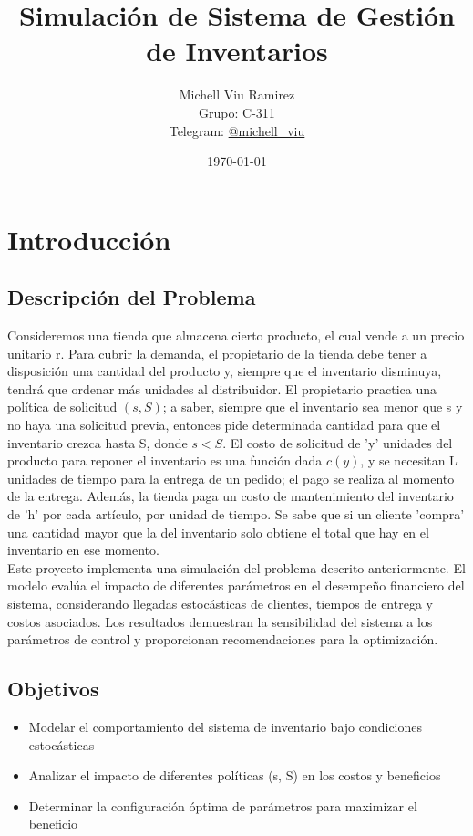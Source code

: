 \documentclass{article}
\title{Simulación de Sistema de Gestión de Inventarios}
\author{Michell Viu Ramirez \\ Grupo: C-311 \\ Telegram: \href{https://t.me/michell_viu}{@michell\_viu}}
\date{\today}
\begin{document}
\maketitle
\newpage

\section{Introducción}

\subsection{Descripción del Problema}
Consideremos una tienda que almacena cierto producto, el cual vende a un precio unitario r.
Para cubrir la demanda, el propietario de la tienda debe tener a disposición una cantidad del producto
y, siempre que el inventario disminuya, tendrá que ordenar más unidades al distribuidor.
El propietario practica una política de solicitud $(s,S)$; a saber, siempre que el inventario sea
menor que s y no haya una solicitud previa, entonces pide determinada cantidad para que
el inventario crezca hasta S, donde $s < S$. El costo de solicitud de 'y' unidades del producto para reponer el inventario 
es una función dada $c(y)$, y se necesitan L unidades de tiempo para la entrega de un pedido; el pago se realiza al momento de la entrega.
Además, la tienda paga un costo de mantenimiento del inventario de 'h' por cada artículo, por unidad de tiempo. Se sabe que si un cliente
'compra' una cantidad mayor que la del inventario solo obtiene el total que hay en el inventario en ese momento.\\

Este proyecto implementa una simulación del problema descrito anteriormente. El modelo evalúa el impacto de diferentes parámetros en el desempeño financiero del sistema, 
considerando llegadas estocásticas de clientes, tiempos de entrega y costos asociados. Los resultados demuestran la sensibilidad del sistema a los parámetros de control y 
proporcionan recomendaciones para la optimización.

\subsection{Objetivos}
\begin{itemize}
    \item Modelar el comportamiento del sistema de inventario bajo condiciones estocásticas
    \item Analizar el impacto de diferentes políticas (s, S) en los costos y beneficios
    \item Determinar la configuración óptima de parámetros para maximizar el beneficio
\end{itemize}
\end{document}
